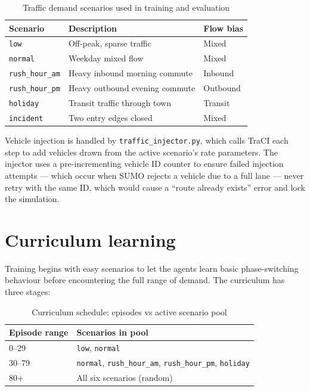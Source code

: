 \documentclass[11pt, a4paper]{report}
\begin{document}
\begin{table}[H]
\centering
\caption{Traffic demand scenarios used in training and evaluation}
\label{tab:scenarios}
\begin{tabular}{lll}
\toprule
\textbf{Scenario} & \textbf{Description} & \textbf{Flow bias} \\
\midrule
\texttt{low} & Off-peak, sparse traffic & Mixed \\
\texttt{normal} & Weekday mixed flow & Mixed \\
\texttt{rush\_hour\_am} & Heavy inbound morning commute & Inbound \\
\texttt{rush\_hour\_pm} & Heavy outbound evening commute & Outbound \\
\texttt{holiday} & Transit traffic through town & Transit \\
\texttt{incident} & Two entry edges closed & Mixed \\
\bottomrule
\end{tabular}
\end{table}

Vehicle injection is handled by \texttt{traffic\_injector.py}, which calls TraCI each step to add vehicles drawn from the active scenario's rate parameters. The injector uses a pre-incrementing vehicle ID counter to ensure failed injection attempts --- which occur when SUMO rejects a vehicle due to a full lane --- never retry with the same ID, which would cause a ``route already exists'' error and lock the simulation.

\section{Curriculum learning}

Training begins with easy scenarios to let the agents learn basic phase-switching behaviour before encountering the full range of demand. The curriculum has three stages:

\begin{table}[H]
\centering
\caption{Curriculum schedule: episodes vs active scenario pool}
\label{tab:curriculum}
\begin{tabular}{ll}
\toprule
\textbf{Episode range} & \textbf{Scenarios in pool} \\
\midrule
0--29 & \texttt{low}, \texttt{normal} \\
30--79 & \texttt{normal}, \texttt{rush\_hour\_am}, \texttt{rush\_hour\_pm}, \texttt{holiday} \\
80+ & All six scenarios (random) \\
\bottomrule
\end{tabular}
\end{table}
\end{document}
